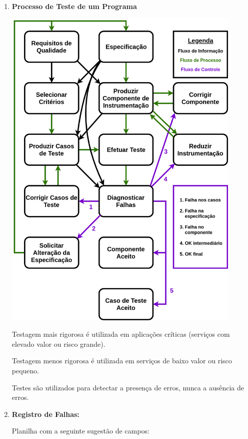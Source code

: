 \documentclass[
	12pt, %
]{fphw}
\begin{document}
\begin{doublespace}
\begin{enumerate}[label=\textbf{\arabic*)}]
\begin{itemize}
              \end{itemize}

        \item \textbf{Processo de Teste de um Programa}

              \includegraphics[width=0.9\textwidth]{2.png}

              Testagem mais rigorosa é utilizada em aplicações críticas (serviços com elevado valor ou risco grande).

              Testagem menos rigorosa é utilizada em serviços de baixo valor ou risco pequeno.

              Testes são utilizados para detectar a presença de erros, nunca a ausência de erros.

        \item \textbf{Registro de Falhas:}

              Planilha com a seguinte sugestão de campos:

              \begin{enumerate}


\end{enumerate}
\end{enumerate}
\end{doublespace}
\end{document}
